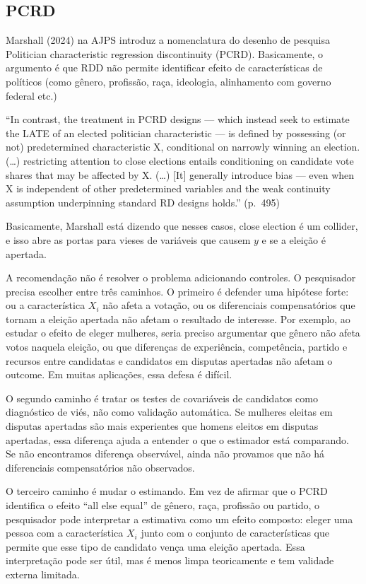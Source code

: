 \documentclass[
]{article}
\begin{document}
\subsection{PCRD}\label{pcrd}

Marshall (2024) na AJPS introduz a nomenclatura do desenho de pesquisa Politician characteristic regression discontinuity (PCRD). Basicamente, o argumento é que RDD não permite identificar efeito de características de políticos (como gênero, profissão, raça, ideologia, alinhamento com governo federal etc.)

``In contrast, the treatment in PCRD designs --- which instead seek to estimate the LATE of an elected politician characteristic --- is defined by possessing (or not) predetermined characteristic X, conditional on narrowly winning an election. (\ldots) restricting attention to close elections entails conditioning on candidate vote shares that may be affected by X. (\ldots) {[}It{]} generally introduce bias --- even when X is independent of other predetermined variables and the weak continuity assumption underpinning standard RD designs holds.'' (p.~495)

Basicamente, Marshall está dizendo que nesses casos, close election é um collider, e isso abre as portas para vieses de variáveis que causem \(y\) e se a eleição é apertada.

A recomendação não é resolver o problema adicionando controles. O pesquisador precisa escolher entre três caminhos. O primeiro é defender uma hipótese forte: ou a característica \(X_i\) não afeta a votação, ou os diferenciais compensatórios que tornam a eleição apertada não afetam o resultado de interesse. Por exemplo, ao estudar o efeito de eleger mulheres, seria preciso argumentar que gênero não afeta votos naquela eleição, ou que diferenças de experiência, competência, partido e recursos entre candidatas e candidatos em disputas apertadas não afetam o outcome. Em muitas aplicações, essa defesa é difícil.

O segundo caminho é tratar os testes de covariáveis de candidatos como diagnóstico de viés, não como validação automática. Se mulheres eleitas em disputas apertadas são mais experientes que homens eleitos em disputas apertadas, essa diferença ajuda a entender o que o estimador está comparando. Se não encontramos diferença observável, ainda não provamos que não há diferenciais compensatórios não observados.

O terceiro caminho é mudar o estimando. Em vez de afirmar que o PCRD identifica o efeito ``all else equal'' de gênero, raça, profissão ou partido, o pesquisador pode interpretar a estimativa como um efeito composto: eleger uma pessoa com a característica \(X_i\) junto com o conjunto de características que permite que esse tipo de candidato vença uma eleição apertada. Essa interpretação pode ser útil, mas é menos limpa teoricamente e tem validade externa limitada.
\end{document}
